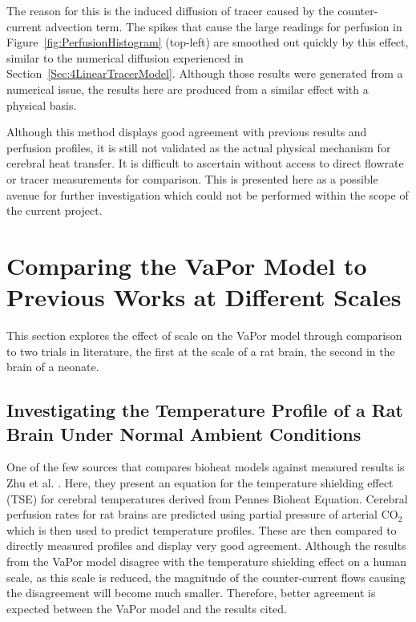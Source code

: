 \documentclass[11pt,english,a4paper,twoside,openright]{report}
\begin{document}
{{{{{{{The reason for this is the induced diffusion of tracer caused by the counter-current advection term. The spikes that cause the large readings for perfusion in Figure~\ref{fig:PerfusionHistogram} (top-left) are smoothed out quickly by this effect, similar to the numerical diffusion experienced in Section~\ref{Sec:4LinearTracerModel}. Although those results were generated from a numerical issue, the results here are produced from a similar effect with a physical basis. 

Although this method displays good agreement with previous results and perfusion profiles, it is still not validated as the actual physical mechanism for cerebral heat transfer. It is difficult to ascertain without access to direct flowrate or tracer measurements for comparison. This is presented here as a possible avenue for further investigation which could not be performed within the scope of the current project.  

\section[Comparing the VaPor Model to Previous Works at Different Scales]{{\Large C}omparing the {\Large V}a{\Large P}or {\Large M}odel to {\Large P}revious {\Large W}orks at {\Large D}ifferent {\Large S}cales}

This section explores the effect of scale on the VaPor model through comparison to two trials in literature, the first at the scale of a rat brain, the second in the brain of a neonate.

\subsection{Investigating the Temperature Profile of a Rat Brain Under Normal Ambient Conditions}
\label{Sec:5RatBrains}

One of the few sources that compares bioheat models against measured results is Zhu et al. \cite{zhu2006body}. Here, they present an equation for the temperature shielding effect (TSE) for cerebral temperatures derived from Pennes Bioheat Equation. Cerebral perfusion rates for rat brains are predicted using partial pressure of arterial CO$_{2}$ which is then used to predict temperature profiles. These are then compared to directly measured profiles and display very good agreement. Although the results from the VaPor model disagree with the temperature shielding effect on a human scale, as this scale is reduced, the magnitude of the counter-current flows causing the disagreement will become much smaller. Therefore, better agreement is expected between the VaPor model and the results cited.

}}}}}}}
\end{document}
